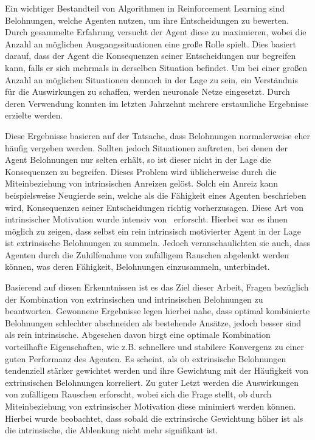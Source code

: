 \documentclass[draft,final]{vutinfth} %
\begin{document}
    \begin{kurzfassung}
        Ein wichtiger Bestandteil von Algorithmen in Reinforcement Learning sind Belohnungen, welche Agenten nutzen, um ihre Entscheidungen zu bewerten.
        Durch gesammelte Erfahrung versucht der Agent diese zu maximieren, wobei die Anzahl an möglichen Ausgangssituationen eine große Rolle spielt.
        Dies basiert darauf, dass der Agent die Konsequenzen seiner Entscheidungen nur begreifen kann, falls er sich mehrmals in derselben Situation befindet.
        Um bei einer großen Anzahl an möglichen Situationen dennoch in der Lage zu sein, ein Verständnis für die Auswirkungen zu schaffen, werden neuronale Netze eingesetzt.
        Durch deren Verwendung konnten im letzten Jahrzehnt mehrere erstaunliche Ergebnisse erzielte werden.

        Diese Ergebnisse basieren auf der Tatsache, dass Belohnungen normalerweise eher häufig vergeben werden.
        Sollten jedoch Situationen auftreten, bei denen der Agent Belohnungen nur selten erhält, so ist dieser nicht in der Lage die Konsequenzen zu begreifen.
        Dieses Problem wird üblicherweise durch die Miteinbeziehung von intrinsischen Anreizen gelöst.
        Solch ein Anreiz kann beispielsweise Neugierde sein, welche als die Fähigkeit eines Agenten beschrieben wird, Konsequenzen seiner Entscheidungen richtig vorherzusagen.
        Diese Art von intrinsischer Motivation wurde intensiv von~\cite{burda_large-scale_2018-1} erforscht.
        Hierbei war es ihnen möglich zu zeigen, dass selbst ein rein intrinsisch motivierter Agent in der Lage ist extrinsische Belohnungen zu sammeln.
        Jedoch veranschaulichten sie auch, dass Agenten durch die Zuhilfenahme von zufälligem Rauschen abgelenkt werden können, was deren Fähigkeit, Belohnungen einzusammeln, unterbindet.

        Basierend auf diesen Erkenntnissen ist es das Ziel dieser Arbeit, Fragen bezüglich der Kombination von extrinsischen und intrinsischen Belohnungen zu beantworten.
        Gewonnene Ergebnisse legen hierbei nahe, dass optimal kombinierte Belohnungen schlechter abschneiden als bestehende Ansätze, jedoch besser sind als rein intrinsische.
        Abgesehen davon birgt eine optimale Kombination vorteilhafte Eigenschaften, wie z.B. schnellere und stabilere Konvergenz zu einer guten Performanz des Agenten.
        Es scheint, als ob extrinsische Belohnungen tendenziell stärker gewichtet werden und ihre Gewichtung mit der Häufigkeit von extrinsischen Belohnungen korreliert.
        Zu guter Letzt werden die Auswirkungen von zufälligem Rauschen erforscht, wobei sich die Frage stellt, ob durch Miteinbeziehung von extrinsischer Motivation diese minimiert werden können.
        Hierbei wurde beobachtet, dass sobald die extrinsische Gewichtung höher ist als die intrinsische, die Ablenkung nicht mehr signifikant ist.
    \end{kurzfassung}
\end{document}
